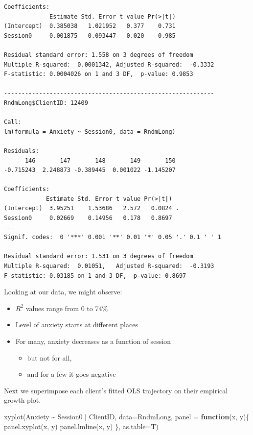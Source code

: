 \documentclass[
  english,
]{book}
\newenvironment{Shaded}{\begin{snugshade}}{\end{snugshade}}
\newcommand{\AttributeTok}[1]{\textcolor[rgb]{0.77,0.63,0.00}{#1}}
\newcommand{\ControlFlowTok}[1]{\textcolor[rgb]{0.13,0.29,0.53}{\textbf{#1}}}
\newcommand{\FunctionTok}[1]{\textcolor[rgb]{0.00,0.00,0.00}{#1}}
\newcommand{\NormalTok}[1]{#1}
\newcommand{\SpecialCharTok}[1]{\textcolor[rgb]{0.00,0.00,0.00}{#1}}
\providecommand{\tightlist}{%
  \setlength{\itemsep}{0pt}\setlength{\parskip}{0pt}}
\begin{document}
\begin{verbatim}
Coefficients:
             Estimate Std. Error t value Pr(>|t|)
(Intercept)  0.385038   1.021952   0.377    0.731
Session0    -0.001875   0.093447  -0.020    0.985

Residual standard error: 1.558 on 3 degrees of freedom
Multiple R-squared:  0.0001342, Adjusted R-squared:  -0.3332 
F-statistic: 0.0004026 on 1 and 3 DF,  p-value: 0.9853

------------------------------------------------------------ 
RndmLong$ClientID: 12409

Call:
lm(formula = Anxiety ~ Session0, data = RndmLong)

Residuals:
      146       147       148       149       150 
-0.715243  2.248873 -0.389445  0.001022 -1.145207 

Coefficients:
            Estimate Std. Error t value Pr(>|t|)  
(Intercept)  3.95251    1.53686   2.572   0.0824 .
Session0     0.02669    0.14956   0.178   0.8697  
---
Signif. codes:  0 '***' 0.001 '**' 0.01 '*' 0.05 '.' 0.1 ' ' 1

Residual standard error: 1.531 on 3 degrees of freedom
Multiple R-squared:  0.01051,   Adjusted R-squared:  -0.3193 
F-statistic: 0.03185 on 1 and 3 DF,  p-value: 0.8697
\end{verbatim}

Looking at our data, we might observe:

\begin{itemize}
\tightlist
\item
  \(R^2\) values range from 0 to 74\%
\item
  Level of anxiety starts at different places
\item
  For many, anxiety decreases as a function of session

  \begin{itemize}
  \tightlist
  \item
    but not for all,
  \item
    and for a few it goes negative
  \end{itemize}
\end{itemize}

Next we superimpose each client's fitted OLS trajectory on their empirical growth plot.

\begin{Shaded}
\begin{Highlighting}[]
\FunctionTok{xyplot}\NormalTok{(Anxiety }\SpecialCharTok{\textasciitilde{}}\NormalTok{ Session0 }\SpecialCharTok{|}\NormalTok{ ClientID, }\AttributeTok{data=}\NormalTok{RndmLong,}
  \AttributeTok{panel =} \ControlFlowTok{function}\NormalTok{(x, y)\{}
    \FunctionTok{panel.xyplot}\NormalTok{(x, y)}
    \FunctionTok{panel.lmline}\NormalTok{(x, y)}
\NormalTok{  \},  }\AttributeTok{as.table=}\NormalTok{T)}
\end{Highlighting}
\end{Shaded}
\end{document}
